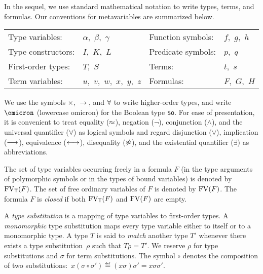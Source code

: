  In the sequel, we use standard
mathematical notation to write types, terms, and formulas. Our conventions
for metavariables are summarized below.
%
\begin{center}
\begin{tabular}{l@{\enskip}l@{\qquad}l@{\enskip}l}
Type variables: & $\alpha,$ $\beta,$ $\gamma$ &
  Function symbols: & $f,$ $g,$ $h$ \\
Type constructors: & $I,$ $K,$ $L$ &
  Predicate symbols: & $p,$ $q$ \\
First-order types: & $T,$ $S$ &
  Terms: & $t,$ $s$ \\
Term variables: & $u,$ $v,$ $w,$ $x,$ $y,$ $z$ &
  Formulas: & $F,$ $G,$ $H$
\end{tabular}
\end{center}
%

We use the symbols ${\times}$, ${\to}$, and ${\forall}$
to write higher-order types, and write $\omicron$ (lowercase omicron) for the
Boolean type {\tt \$o}. For ease of presentation, it is convenient to treat
equality ($\approx$), negation ($\lnot$), conjunction ($\land$), and the universal
quantifier ($\forall$) as logical symbols and regard disjunction ($\lor$),
implication ($\longrightarrow$), equivalence ($\longleftrightarrow$), disequality ($\not\approx$), and the
existential quantifier ($\exists$) as abbreviations.

The set of type variables occurring freely in a formula $F$
(in the type arguments of polymorphic symbols or
in the types of bound variables) is denoted by $\mathrm{FV}_\mathsf{T}(F)$.
The set of free ordinary variables of $F$
is denoted by $\mathrm{FV}(F)$. The formula $F$ is {\em closed\/}
if both $\mathrm{FV}_\mathsf{T}(F)$ and $\mathrm{FV}(F)$ are empty.

A {\em type substitution\/} is a mapping of type variables
to first-order types. A {\em monomorphic\/} type substitution
maps every type variable either to itself or to a monomorphic type.
%
A type $T$ is said to {\em match\/} another type $T'$ whenever there exists a
type substitution~$\rho$ such that $T\rho = T'$. We reserve $\rho$ for type
substitutions and $\sigma$ for term substitutions.
%
The symbol $\circ$ denotes the composition
of two substitutions:\ 
$x(\sigma \circ \sigma') \eqdef (x\sigma)\sigma' = x\sigma\sigma'$.

